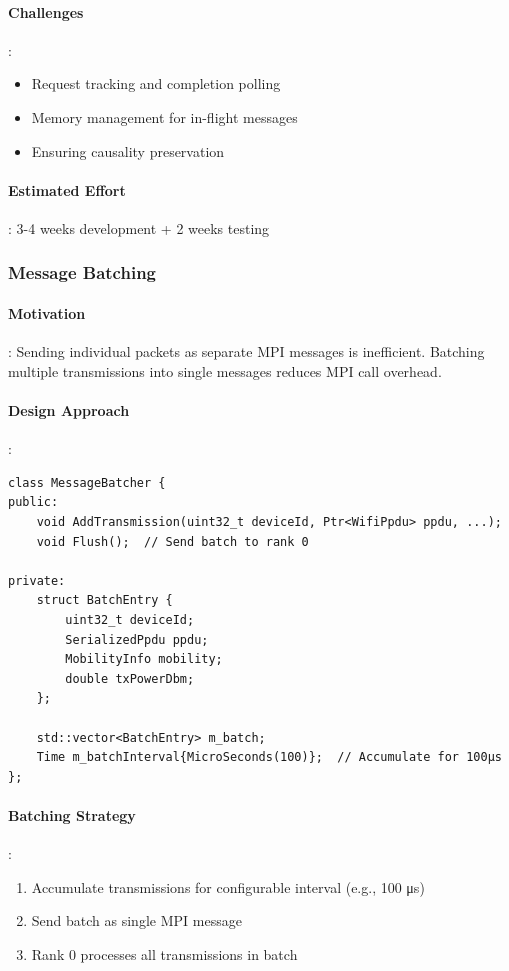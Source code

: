 \paragraph{Challenges}:
\begin{itemize}
    \item Request tracking and completion polling
    \item Memory management for in-flight messages
    \item Ensuring causality preservation
\end{itemize}

\paragraph{Estimated Effort}: 3-4 weeks development + 2 weeks testing

\subsubsection{Message Batching}

\paragraph{Motivation}:
Sending individual packets as separate MPI messages is inefficient. Batching multiple transmissions into single messages reduces MPI call overhead.

\paragraph{Design Approach}:
\begin{lstlisting}[style=cpp]
class MessageBatcher {
public:
    void AddTransmission(uint32_t deviceId, Ptr<WifiPpdu> ppdu, ...);
    void Flush();  // Send batch to rank 0
    
private:
    struct BatchEntry {
        uint32_t deviceId;
        SerializedPpdu ppdu;
        MobilityInfo mobility;
        double txPowerDbm;
    };
    
    std::vector<BatchEntry> m_batch;
    Time m_batchInterval{MicroSeconds(100)};  // Accumulate for 100μs
};
\end{lstlisting}

\paragraph{Batching Strategy}:
\begin{enumerate}
    \item Accumulate transmissions for configurable interval (e.g., 100 μs)
    \item Send batch as single MPI message
    \item Rank 0 processes all transmissions in batch
\end{enumerate}

